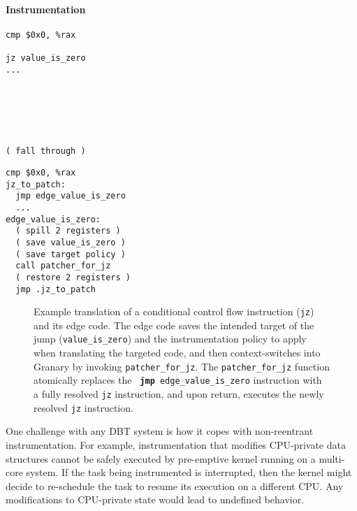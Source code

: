 \documentclass[preprint]{sigplanconf}
\begin{document}
\paragraph{Instrumentation}

\lstset{language=[x64]Assembler}
\newsavebox\nativejcc
\begin{lrbox}{\nativejcc}
\begin{minipage}[b]{4cm}
\begin{lstlisting}[basicstyle=\footnotesize\ttfamily]cmp $0x0, %rax

jz value_is_zero 
...






( fall through )
\end{lstlisting}
\end{minipage}
\end{lrbox}

\newsavebox\translatedjcc
\begin{lrbox}{\translatedjcc}\begin{minipage}[b]{4cm}\begin{lstlisting}[basicstyle=\footnotesize\ttfamily]  cmp $0x0, %rax
jz_to_patch:
  jmp edge_value_is_zero
  ...
edge_value_is_zero:
  ( spill 2 registers )
  ( save value_is_zero )
  ( save target policy )
  call patcher_for_jz
  ( restore 2 registers )
  jmp .jz_to_patch
\end{lstlisting}
\end{minipage}
\end{lrbox}

\begin{figure}[t!]
\hfill
\caption{\label{fig:direct_edge_code}Example translation of a conditional control flow instruction (\texttt{jz}) and its edge code. The edge code saves the intended target of the jump (\texttt{value\_is\_zero}) and the instrumentation policy to apply when translating the targeted code, and then context-switches into Granary by invoking \texttt{patcher\_for\_jz}. The \texttt{patcher\_for\_jz} function atomically replaces the {\bf\texttt{ jmp}}\texttt{ edge\_value\_is\_zero} instruction with a fully resolved \texttt{jz} instruction, and upon return, executes the newly resolved \texttt{jz} instruction.}
\end{figure}

One challenge with any DBT system is how it copes with non-reentrant instrumentation. For example, instrumentation that modifies CPU-private data structures cannot be safely executed by pre-emptive kernel running on a multi-core system. If the task being instrumented is interrupted, then the kernel might decide to re-schedule the task to resume its execution on a different CPU. Any modifications to CPU-private state would lead to undefined behavior.
\end{document}
